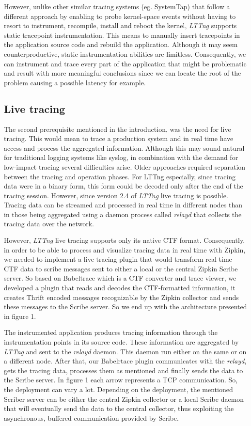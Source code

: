 \documentclass[a4paper,12pt]{article}
\begin{document}
However, unlike other similar tracing systems (eg. SystemTap\cite{systemtap})
that follow a different approach by enabling to probe kernel-space events without
having to resort to instrument, recompile, install and reboot the kernel,
\emph{LTTng} supports static tracepoint instrumentation. This means to manually
insert tracepoints in the application source code and rebuild the application. 
Although it may seem counterproductive, static instrumentation abilities are 
limitless. Consequently, we can instrument and trace every part of the 
application that  might be problematic and result with more meaningful 
conclusions since we can locate the root of the problem causing a possible
latency for example.

\subsection{Live tracing}
The second prerequisite mentioned in the introduction, was the need for live 
tracing. This would mean to trace a production system and in real time have 
access and process the aggregated information. Although this may sound natural
for traditional logging systems like syslog, in combination with the demand for
low-impact tracing several difficulties arise. Older approaches required 
separation between the tracing and operation phases. For LTTng especially, since
tracing data were in a binary form, this form could be decoded only after the 
end of the tracing session. However, since version 2.4 of \emph{LTTng} live 
tracing is possible. Tracing data can be streamed and processed in real time in
different nodes than in those being aggregated using a daemon process called 
\emph{relayd} that collects the tracing data over the network.

However, \emph{LTTng} live tracing supports only its native CTF format. 
Consequently, in order to be able to process and visualize tracing data in real
time with Zipkin, we needed to implement a live-tracing plugin that would 
transform real time CTF data to scribe messages sent to either a local or the
central Zipkin Scribe server. So based on Babeltrace\cite{bltrace} which is a 
CTF converter and trace viewer, we developed a plugin that reads and decodes the
CTF-formatted information, it creates Thrift\cite{thrift} encoded messages 
recognizable by the Zipkin collector and sends these messages to the Scribe 
server. So we end up with the architecture presented in figure 1.

The instrumented application produces tracing information through the 
instrumentation points in its source code. These information are aggregated by 
\emph{LTTng} and sent to the \emph{relayd} daemon. This daemon run
either on the same or on a different node. After that, our Babelrtace plugin 
communicates with the \emph{relayd}, gets the tracing data, processes them as 
mentioned and finally sends the data to the Scribe server. 
In figure 1 each arrow represents a TCP communication. So, the deployment can
vary a lot. Depending on the deployment, the mentioned Scriber server can be 
either the central Zipkin collector or a local Scribe daemon that will 
eventually send the data to the central collector, thus exploiting the 
asynchronous, buffered communication provided by Scribe.
\end{document}

